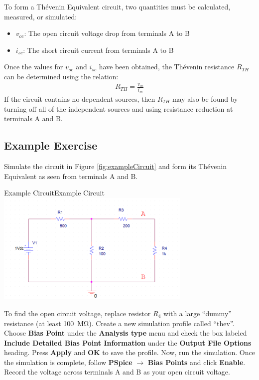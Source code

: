 \documentclass[12pt]{../manual}
\begin{document}
To form a Th\'evenin Equivalent circuit, two quantities must be calculated, measured, or simulated:
\begin{itemize}
\item $v_{oc}$: The open circuit voltage drop from terminals A to B
\item $i_{sc}$: The short circuit current from terminals A to B
\end{itemize}
Once the values for $v_{oc}$ and $i_{sc}$ have been obtained, the Th\'evenin resistance $R_{TH}$ can be determined using the relation:
\begin{align}
R_{TH} = \frac{v_{oc}}{i_{sc}} \label{eq:rth}
\end{align}
If the circuit contains no dependent sources, then $R_{TH}$ may also be found by turning off all of the independent sources and using resistance reduction at terminals A and B.

\newpage
\subsection{Example Exercise}
Simulate the circuit in Figure \ref{fig:exampleCircuit} and form its Th\'evenin Equivalent as seen from terminals A and B.

\begin{myfigure}[colback=white,label=fig:exampleCircuit]{Example Circuit}{Example Circuit}
\centering
\includegraphics[width=0.7\textwidth]{figures/ExampleCircuitSchematicCrop.PNG}
\end{myfigure}

To find the open circuit voltage, replace resistor $R_4$ with a large ``dummy'' resistance (at least \SI{100}{\mega\ohm}). Create a new simulation profile called ``thev''. Choose \textbf{Bias Point} under the \textbf{Analysis type} menu and check the box labeled \textbf{Include Detailed Bias Point Information} under the \textbf{Output File Options} heading. Press \textbf{Apply} and \textbf{OK} to save the profile. Now, run the simulation. Once the simulation is complete, follow \textbf{PSpice} $\to$ \textbf{Bias Points} and click \textbf{Enable}. Record the voltage across terminals A and B as your open circuit voltage.
\end{document}
